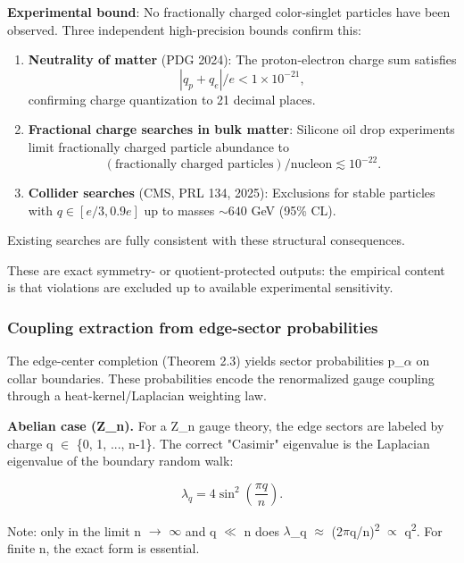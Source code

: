 \textbf{Experimental bound}: No fractionally charged color-singlet particles have been observed. Three independent high-precision bounds confirm this:

\begin{enumerate}
\def\labelenumi{\arabic{enumi}.}
\item
  \textbf{Neutrality of matter} (PDG 2024): The proton-electron charge sum satisfies \[|q_p + q_e|/e < 1 \times 10^{-21},\] confirming charge quantization to 21 decimal places.
\item
  \textbf{Fractional charge searches in bulk matter}: Silicone oil drop experiments limit fractionally charged particle abundance to \[(\text{fractionally charged particles})/\text{nucleon} \lesssim 10^{-22}.\]
\item
  \textbf{Collider searches} (CMS, PRL 134, 2025): Exclusions for stable particles with \(q \in [e/3, 0.9e]\) up to masses \(\sim 640\) GeV (95\% CL).
\end{enumerate}

Existing searches are fully consistent with these structural consequences.

These are exact symmetry- or quotient-protected outputs: the empirical content is that violations are excluded up to available experimental sensitivity.

\subsubsection{Coupling extraction from edge-sector probabilities}\label{613-coupling-extraction-from-edge-sector-probabilities}

The edge-center completion (Theorem 2.3) yields sector probabilities p\_\ensuremath{\alpha} on collar boundaries. These probabilities encode the renormalized gauge coupling through a heat-kernel/Laplacian weighting law.

\textbf{Abelian case (Z\_n).} For a Z\_n gauge theory, the edge sectors are labeled by charge q \ensuremath{\in} \{0, 1, ..., n-1\}. The correct "Casimir" eigenvalue is the Laplacian eigenvalue of the boundary random walk:

\[
\lambda_q = 4 \sin^2\left(\frac{\pi q}{n}\right).
\]

Note: only in the limit n \ensuremath{\to} \ensuremath{\infty} and q \ensuremath{\ll} n does \ensuremath{\lambda}\_q \ensuremath{\approx} (2\ensuremath{\pi}q/n)\textsuperscript{2} \ensuremath{\propto} q\textsuperscript{2}. For finite n, the exact form is essential.

